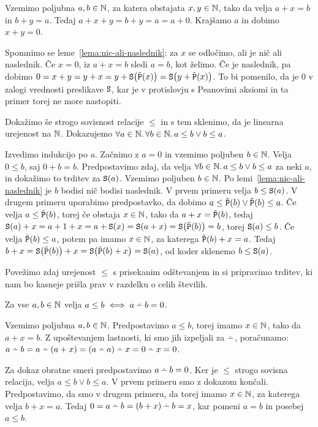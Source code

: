 Vzemimo poljubna $a, b \in \mathbb{N}$, za katera obstajata $x, y \in \mathbb{N}$, tako da velja $a + x = b$ in $b + y = a$. Tedaj $a + x + y = b + y = a = a + 0$. Krajšamo $a$ in dobimo $x + y = 0$.

Spomnimo se leme~\ref{lema:nic-ali-naslednik}: za $x$ se odločimo, ali je nič ali naslednik. Če $x = 0$, iz $a + x = b$ sledi $a = b$, kot želimo. Če je naslednik, pa dobimo $0 = x + y = y + x = y + \mathtt{S}\big(\tilde{\mathtt{P}}(x)\big) = \mathtt{S}\big(y + \tilde{\mathtt{P}}(x)\big)$. To bi pomenilo, da je $0$ v zalogi vrednosti preslikave $\mathtt{S}$, kar je v protislovju s Peanovimi aksiomi in ta primer torej ne more nastopiti.

Dokažimo še strogo sovisnost relacije $\leq$ in s tem sklenimo, da je linearna urejenost na $\mathbb{N}$. Dokazujemo $\forall a \in \mathbb{N} .\,\forall b \in \mathbb{N} .\,{a \leq b \lor b \leq a}$.

Izvedimo indukcijo po $a$. Začnimo z $a = 0$ in vzemimo poljuben $b \in \mathbb{N}$. Velja $0 \leq b$, saj $0 + b = b$. Predpostavimo zdaj, da velja $\forall b \in \mathbb{N} .\,{a \leq b \lor b \leq a}$ za neki $a$, in dokažimo to trditev za $\mathtt{S}(a)$. Vzemimo poljuben $b \in \mathbb{N}$. Po lemi~\ref{lema:nic-ali-naslednik} je $b$ bodisi nič bodisi naslednik. V prvem primeru velja $b \leq \mathtt{S}(a)$. V drugem primeru uporabimo predpostavko, da dobimo $a \leq \tilde{\mathtt{P}}(b) \lor \tilde{\mathtt{P}}(b) \leq a$. Če velja $a \leq \tilde{\mathtt{P}}(b)$, torej če obstaja $x \in \mathbb{N}$, tako da $a + x = \tilde{\mathtt{P}}(b)$, tedaj $\mathtt{S}(a) + x = a + 1 + x = a + \mathtt{S}(x) = \mathtt{S}(a + x) = \mathtt{S}\big(\tilde{\mathtt{P}}(b)\big) = b$, torej $\mathtt{S}(a) \leq b$. Če velja $\tilde{\mathtt{P}}(b) \leq a$, potem pa imamo $x \in \mathbb{N}$, za katerega $\tilde{\mathtt{P}}(b) + x = a$. Tedaj $b + x = \mathtt{S}\big(\tilde{\mathtt{P}}(b)\big) + x = \mathtt{S}\big(\tilde{\mathtt{P}}(b) + x\big) = \mathtt{S}(a)$, od koder sklenemo $b \leq \mathtt{S}(a)$.

Povežimo zdaj urejenost $\leq$ s prisekanim odštevanjem in si pripravimo trditev, ki nam bo kasneje prišla prav v razdelku o celih številih.

\begin{trditev}
Za vse $a, b \in \mathbb{N}$ velja $a \leq b \iff a \monus b = 0$.
\end{trditev}

\begin{dokaz}
Vzemimo poljubna $a, b \in \mathbb{N}$. Predpostavimo $a \leq b$, torej imamo $x \in \mathbb{N}$, tako da $a + x = b$. Z upoštevanjem lastnosti, ki smo jih izpeljali za $\monus$, poračunamo: $a \monus b = a \monus (a + x) = (a \monus a) \monus x = 0 \monus x = 0$.

Za dokaz obratne smeri predpostavimo $a \monus b = 0$. Ker je $\leq$ strogo sovisna relacija, velja $a \leq b \lor b \leq a$. V prvem primeru smo z dokazom končali. Predpostavimo, da smo v drugem primeru, da torej imamo $x \in \mathbb{N}$, za katerega velja $b + x = a$. Tedaj $0 = a \monus b = (b + x) \monus b = x$, kar pomeni $a = b$ in posebej $a \leq b$.
\end{dokaz}


